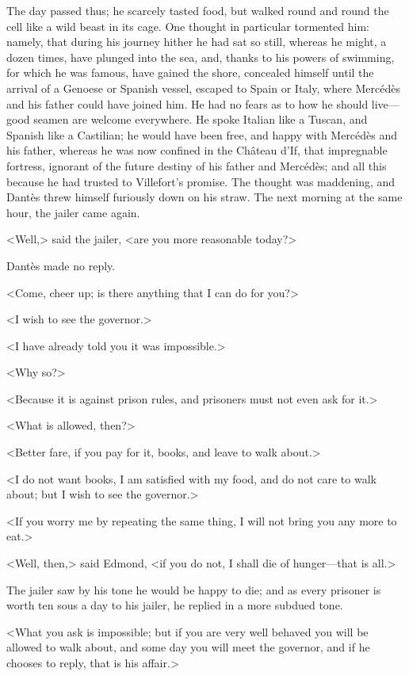  The day passed thus; he scarcely tasted food, but walked round and round the cell like a wild beast in its cage. One thought in particular tormented him: namely, that during his journey hither he had sat so still, whereas he might, a dozen times, have plunged into the sea, and, thanks to his powers of swimming, for which he was famous, have gained the shore, concealed himself until the arrival of a Genoese or Spanish vessel, escaped to Spain or Italy, where Mercédès and his father could have joined him. He had no fears as to how he should live—good seamen are welcome everywhere. He spoke Italian like a Tuscan, and Spanish like a Castilian; he would have been free, and happy with Mercédès and his father, whereas he was now confined in the Château d'If, that impregnable fortress, ignorant of the future destiny of his father and Mercédès; and all this because he had trusted to Villefort's promise. The thought was maddening, and Dantès threw himself furiously down on his straw. The next morning at the same hour, the jailer came again. 

 <Well,> said the jailer, <are you more reasonable today?> 
 
 Dantès made no reply. 

 <Come, cheer up; is there anything that I can do for you?> 

 <I wish to see the governor.> 

 <I have already told you it was impossible.> 

 <Why so?> 

 <Because it is against prison rules, and prisoners must not even ask for it.> 

 <What is allowed, then?> 

 <Better fare, if you pay for it, books, and leave to walk about.> 

 <I do not want books, I am satisfied with my food, and do not care to walk about; but I wish to see the governor.> 

 <If you worry me by repeating the same thing, I will not bring you any more to eat.> 

 <Well, then,> said Edmond, <if you do not, I shall die of hunger—that is all.> 

 The jailer saw by his tone he would be happy to die; and as every prisoner is worth ten sous a day to his jailer, he replied in a more subdued tone. 

 <What you ask is impossible; but if you are very well behaved you will be allowed to walk about, and some day you will meet the governor, and if he chooses to reply, that is his affair.> 


